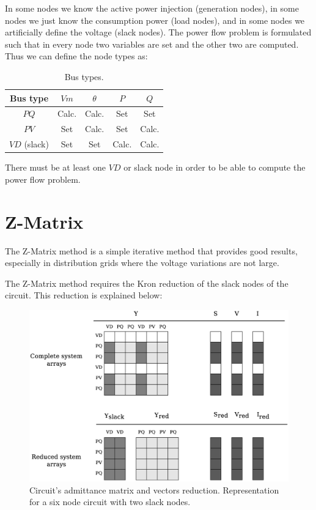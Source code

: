 \documentclass[nols,a4paper,twoside,notoc,fleqn]{tufte-book}
\begin{document}
In some nodes we know the active power injection (generation nodes), in some nodes we just know the consumption power (load nodes), and in some nodes we artificially define the voltage (slack nodes). The power flow problem is formulated such that in every node two variables are set and the other two are computed. Thus we can define the node types as:

\begin{table}[h!]
	\begin{center}
		\begin{tabular}{ccccc}
			\toprule
			
			Bus type & $Vm$ &  $\theta$ & $P$ & $Q$\\
			
			\midrule
			
			$PQ$ & Calc. &  Calc. & Set & Set\\
			$PV$ & Set &  Calc. & Set & Calc.\\
			$VD$ (slack) & Set &  Set & Calc. & Calc.\\
			
			
			\bottomrule
		\end{tabular}
	\end{center}
	\caption{Bus types.}
	\label{bus__types}
\end{table}

There must be at least one $VD$ or slack node in order to be able to compute the power flow problem. 



\section{Z-Matrix}

The Z-Matrix method is a simple iterative method that provides good results, especially in distribution grids where the voltage variations are not large.

The Z-Matrix method requires the Kron reduction of the slack nodes of the circuit. This reduction is explained below:

\begin{figure}[h!]
  \includegraphics[width=\linewidth]{img/Matrix_reduction.eps}
  \caption{Circuit's admittance matrix and vectors reduction. Representation for a six node circuit with two slack nodes.}
  \label{fig:reduction}
\end{figure}
\end{document}
